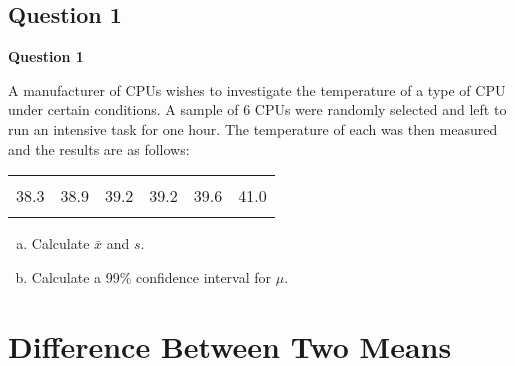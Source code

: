 \documentclass[compress]{beamer}        %
\makeatletter
\newcommand{\tcb}{\textcolor{beamer@blendedblue}}
\makeatother
\begin{document}
\subsection{Question 1}
\begin{frame}{\bf \tcb{Question 1}}

A manufacturer of CPUs wishes to investigate the temperature of a type of CPU under certain conditions. A sample of 6 CPUs were randomly selected and left to run an intensive task for one hour. The temperature of each was then measured and the results are as follows:
\begin{center}
\begin{tabular}{|cccccc|}
\hline
&&&&&\\[-0.4cm]
38.3 & 38.9 & 39.2 & 39.2 & 39.6 & 41.0\\[0.1cm]
\hline
\multicolumn{6}{c}{}\\[-0.3cm]
\end{tabular}
\end{center}

\begin{enumerate}[a)]\itemsep0.3cm
\item Calculate $\bar x$ and $s$.
\item Calculate a 99\% confidence interval for $\mu$.
\end{enumerate}


\end{frame}








\section{Difference Between Two Means}
\end{document}
